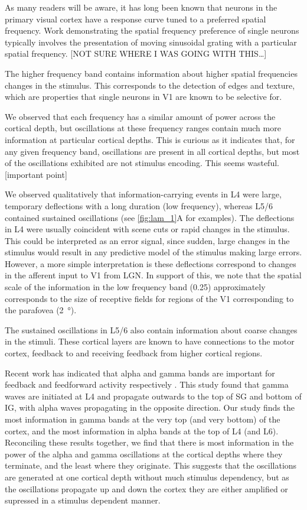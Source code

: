 As many readers will be aware, it has long been known that neurons in the primary visual cortex have a response curve tuned to a preferred spatial frequency.
Work demonstrating the spatial frequency preference of single neurons typically involves the presentation of moving sinusoidal grating with a particular spatial frequency.
[NOT SURE WHERE I WAS GOING WITH THIS{\dots}]

The higher frequency band contains information about higher spatial frequencies changes in the stimulus.
This corresponds to the detection of edges and texture, which are properties that single neurons in \ac{V1} are known to be selective for.


We observed that each frequency has a similar amount of power across the cortical depth, but oscillations at these frequency ranges contain much more information at particular cortical depths.
This is curious as it indicates that, for any given frequency band, oscillations are present in all cortical depths, but most of the oscillations exhibited are not stimulus encoding.
This seems wasteful.
[important point]

We observed qualitatively that information-carrying events in \ac{L4} were large, temporary deflections with a long duration (low frequency), whereas \acs{L5/6} contained sustained oscillations (see \autoref{fig:lam_1}A for examples).
The deflections in \ac{L4} were usually coincident with scene cuts or rapid changes in the stimulus.
This could be interpreted as an error signal, since sudden, large changes in the stimulus would result in any predictive model of the stimulus making large errors.
However, a more simple interpretation is these deflections correspond to changes in the afferent input to \ac{V1} from \ac{LGN}.
In support of this, we note that the spatial scale of the information in the low frequency band (\SI{0.25}{\cpd}) approximately corresponds to the size of receptive fields for regions of the \ac{V1} corresponding to the parafovea (\SI{2}{\degree}).

The sustained oscillations in \acs{L5/6} also contain information about coarse changes in the stimuli.
These cortical layers are known to have connections to the motor cortex, feedback to  and receiving feedback from higher cortical regions.


Recent work has indicated that alpha and gamma bands are important for feedback and feedforward activity respectively \citep{VanKerkoerle2014}.
This study \citep{VanKerkoerle2014} found that gamma waves are initiated at \ac{L4} and propagate outwards to the top of \ac{SG} and bottom of \ac{IG}, with alpha waves propagating in the opposite direction.
Our study finds the most information in gamma bands at the very top (and very bottom) of the cortex, and the most information in alpha bands at the top of \ac{L4} (and \ac{L6}).
Reconciling these results together, we find that there is most information in the power of the alpha and gamma oscillations at the cortical depths where they terminate, and the least where they originate.
This suggests that the oscillations are generated at one cortical depth without much stimulus dependency, but as the oscillations propagate up and down the cortex they are either amplified or supressed in a stimulus dependent manner.

